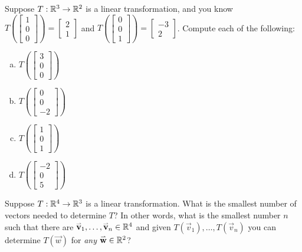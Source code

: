 \begin{applicationActivities}{1}{17}
\begin{activity}{15}
Suppose $T: \mathbb{R}^3 \rightarrow \mathbb{R}^2$ is a linear transformation, and you know $T\left(\begin{bmatrix} 1 \\ 0 \\ 0 \end{bmatrix} \right) = \begin{bmatrix} 2 \\ 1 \end{bmatrix} $ and $T\left(\begin{bmatrix} 0 \\ 0 \\ 1 \end{bmatrix} \right) = \begin{bmatrix} -3 \\ 2 \end{bmatrix} $.  Compute each of the following:
\begin{enumerate}[(a)]
\item $T\left(\begin{bmatrix} 3 \\ 0 \\ 0 \end{bmatrix}\right)$
\item $T\left(\begin{bmatrix} 0 \\ 0 \\ -2 \end{bmatrix}\right)$
\item $T\left(\begin{bmatrix} 1 \\ 0 \\ 1 \end{bmatrix}\right)$
\item $T\left(\begin{bmatrix} -2 \\ 0 \\ 5 \end{bmatrix}\right)$
\end{enumerate}
\end{activity}

\begin{activity}{5}
Suppose $T: \mathbb{R}^4 \rightarrow \mathbb{R}^3$ is a linear transformation.  What is the smallest number of vectors needed to determine $T$?  In other words, what is the smallest number $n$ such that there are $\mathbf{\accentset{\rightharpoonup}{v}}_1,\ldots,\mathbf{\accentset{\rightharpoonup}{v}}_n \in \mathbb{R}^4$ and given  $T(\vec{v}_1), \ldots, T(\vec{v}_n)$ you can determine $T(\vec{w})$ for \textit{any} $\mathbf{\accentset{\rightharpoonup}{w}} \in \mathbb{R}^2$?
\end{activity}


\end{applicationActivities}
